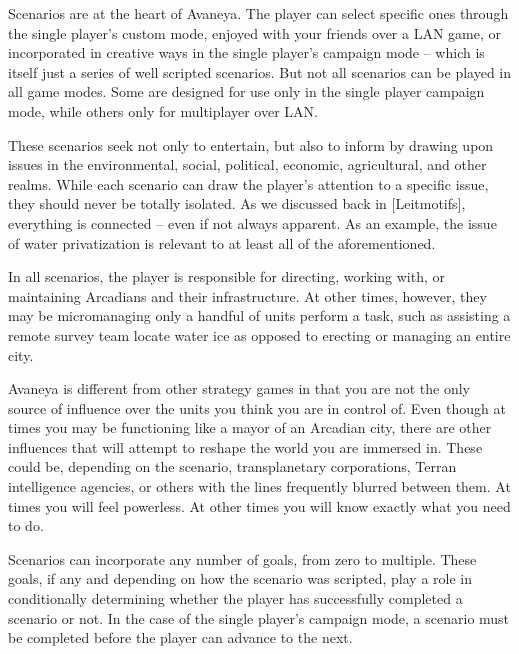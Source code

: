 

Scenarios are at the heart of Avaneya. The player can select specific ones through the single player's custom mode, enjoyed with your friends over a LAN game, or incorporated in creative ways in the single player's campaign mode -- which is itself just a series of well scripted scenarios. But not all scenarios can be played in all game modes. Some are designed for use only in the single player campaign mode, while others only for multiplayer over LAN.

These scenarios seek not only to entertain, but also to inform by drawing upon issues in the environmental, social, political, economic, agricultural, and other realms. While each scenario can draw the player's attention to a specific issue, they should never be totally isolated. As we discussed back in [Leitmotifs], everything is connected -- even if not always apparent. As an example, the issue of water privatization is relevant to at least all of the aforementioned.

In all scenarios, the player is responsible for directing, working with, or maintaining Arcadians and their infrastructure. At other times, however, they may be micromanaging only a handful of units perform a task, such as assisting a remote survey team locate water ice as opposed to erecting or managing an entire city.

Avaneya is different from other strategy games in that you are not the only source of influence over the units you think you are in control of. Even though at times you may be functioning like a mayor of an Arcadian city, there are other influences that will attempt to reshape the world you are immersed in. These could be, depending on the scenario, transplanetary corporations, Terran intelligence agencies, or others with the lines frequently blurred between them. At times you will feel powerless. At other times you will know exactly what you need to do.

Scenarios can incorporate any number of goals, from zero to multiple. These goals, if any and depending on how the scenario was scripted, play a role in conditionally determining whether the player has successfully completed a scenario or not. In the case of the single player's campaign mode, a scenario must be completed before the player can advance to the next.

